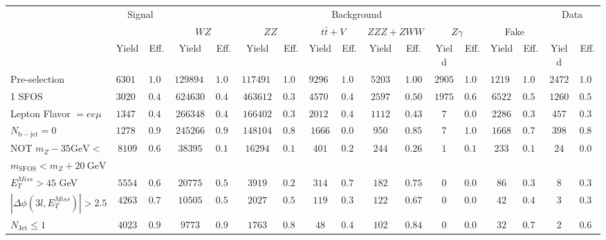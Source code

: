 \begin{tabular}{l||c|c||c|c||c|c||c|c||c|c||c|c||c|c||c|c}
\hline
 &                 \multicolumn{2}{c||}{Signal}            &  \multicolumn{12}{c||}{Background} &  \multicolumn{2}{c}{Data} \\
 & &  & \multicolumn{2}{c||}{$WZ$} & \multicolumn{2}{c||}{$ZZ$} & \multicolumn{2}{c||}{$t\bar{t}+V$} & \multicolumn{2}{c||}{$ZZZ+ZWW$} & \multicolumn{2}{c||}{$Z\gamma$} & \multicolumn{2}{c||}{Fake} &  & \\ 
 & Yield & Eff. & Yield & Eff. & Yield & Eff. & Yield & Eff. & Yield & Eff. & Yield & Eff. & Yield & Eff. & Yield & Eff.\\
\hline\hline
Pre-selection &  $63019$ &  $1.00$ &  $1298941$ &  $1.00$ &  $1174916$ &  $1.00$ &  $92968$ &  $1.00$ &  $5203$ &  $1.00$ &  $2905$ &  $1.00$ &  $12192$ &  $1.00$ &  $2472$ &  $1.00$\\ 
\hline
1 SFOS &  $30204$ &  $0.48$ &  $624630$ &  $0.48$ &  $463612$ &  $0.39$ &  $45701$ &  $0.49$ &  $2597$ &  $0.50$ &  $1975$ &  $0.68$ &  $6522$ &  $0.53$ &  $1260$ &  $0.51$\\ 
\hline
Lepton Flavor $= ee\mu$ &  $13479$ &  $0.45$ &  $266348$ &  $0.43$ &  $166402$ &  $0.36$ &  $20123$ &  $0.44$ &  $1112$ &  $0.43$ &  $7$ &  $0.00$ &  $2286$ &  $0.35$ &  $457$ &  $0.36$\\ 
\hline
$N_{\mathrm{b-jet}} = 0$ &  $12787$ &  $0.95$ &  $245266$ &  $0.92$ &  $148104$ &  $0.89$ &  $1666$ &  $0.08$ &  $950$ &  $0.85$ &  $7$ &  $1.00$ &  $1668$ &  $0.73$ &  $398$ &  $0.87$\\ 
\hline
NOT $m_Z - 35 \mathrm{GeV} <$ &  \multirow{2}{*}{$8109$} &  \multirow{2}{*}{$0.63$} &  \multirow{2}{*}{$38395$} &  \multirow{2}{*}{$0.16$} &  \multirow{2}{*}{$16294$} &  \multirow{2}{*}{$0.11$} &  \multirow{2}{*}{$401$} &  \multirow{2}{*}{$0.24$} &  \multirow{2}{*}{$244$} &  \multirow{2}{*}{$0.26$} &  \multirow{2}{*}{$1$} &  \multirow{2}{*}{$0.14$} &  \multirow{2}{*}{$233$} &  \multirow{2}{*}{$0.14$} &  \multirow{2}{*}{$24$} &  \multirow{2}{*}{$0.06$}\\ 
$ m_{\mathrm{SFOS}} < m_Z + 20~\mathrm{GeV}$  & & & & & & & & & & & & & &  & \\
\hline
$E_{T}^{Miss} > 45$ GeV &  $5554$ &  $0.68$ &  $20775$ &  $0.54$ &  $3919$ &  $0.24$ &  $314$ &  $0.78$ &  $182$ &  $0.75$ &  $0$ &  $0.00$ &  $86$ &  $0.37$ &  $8$ &  $0.33$\\ 
\hline
$|\Delta\phi(3l,E_{T}^{Miss})| > 2.5$ &  $4263$ &  $0.77$ &  $10505$ &  $0.51$ &  $2027$ &  $0.52$ &  $119$ &  $0.38$ &  $122$ &  $0.67$ &  $0$ &  $0.00$ &  $42$ &  $0.49$ &  $3$ &  $0.38$\\ 
\hline
$N_{\mathrm{Jet}} \leq 1$ &  $4023$ &  $0.94$ &  $9773$ &  $0.93$ &  $1763$ &  $0.87$ &  $48$ &  $0.40$ &  $102$ &  $0.84$ &  $0$ &  $0.00$ &  $32$ &  $0.76$ &  $2$ &  $0.67$\\ 
\hline
\end{tabular}
